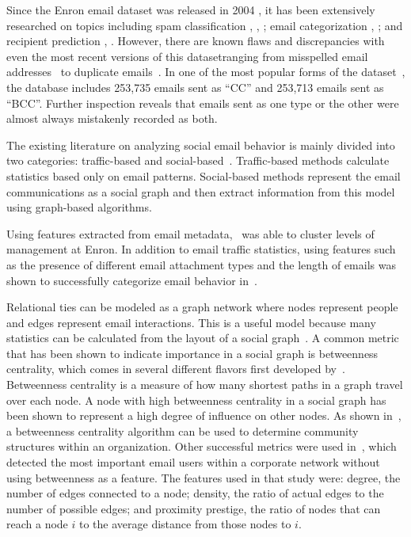 \documentclass{article}
\begin{document}
Since the Enron email dataset was released in 2004 \cite{klimt_introducing_2004}, it has been extensively researched on topics including spam classification \cite{martin_analyzing_2005}, \cite{gaber_e-mail_2016}, \cite{shams_classifying_2013}; email categorization \cite{he_novel_2014}, \cite{keila_structure_2005}; and recipient prediction \cite{sofershtein_predicting_2015}, \cite{hu_towards_2012}.  However, there are known flaws and discrepancies with even the most recent versions of this dataset\textemdash{}ranging from misspelled email addresses~\cite{nordbo_data_2014} to duplicate emails~\cite{waterman_big_2014}. In one of the most popular forms of the dataset~\cite{shetty_enron_2004}, the database includes 253,735 emails sent as ``CC'' and  253,713 emails sent as ``BCC''.  Further inspection reveals that emails sent as one type or the other were almost always mistakenly recorded as both.

The existing literature on analyzing social email behavior is mainly divided into two categories: traffic-based and social-based~\cite{tang_email_2013}.  Traffic-based methods calculate statistics based only on email patterns. Social-based methods represent the email communications as a social graph and then extract information from this model using graph-based algorithms.

Using features extracted from email metadata,~\cite{yelupula_social_2008} was able to cluster levels of management at Enron. In addition to email traffic statistics, using features such as the presence of different email attachment types and the length of emails was shown to successfully categorize email behavior in~\cite{martin_analyzing_2005}.

Relational ties can be modeled as a graph network where nodes represent people and edges represent email interactions.  This is a useful model because many statistics can be calculated from the layout of a social graph~\cite{wasserman_social_1994}.  A common metric that has been shown to indicate importance in a social graph is betweenness centrality, which comes in several different flavors first developed by~\cite{freeman_set_1977}.  Betweenness centrality is a measure of how many shortest paths in a graph travel over each node.  A node with high betweenness centrality in a social graph has been shown to represent a high degree of influence on other nodes.  As shown in~\cite{tyler_email_2003}, a betweenness centrality algorithm can be used to determine community structures within an organization.  Other successful metrics were used in~\cite{wilson_discovery_2009}, which detected the most important email users within a corporate network without using betweenness as a feature.  The features used in that study were: degree, the number of edges connected to a node; density, the ratio of actual edges to the number of possible edges; and proximity prestige, the ratio of nodes that can reach a node $i$ to the average distance from those nodes to $i$.
\end{document}
